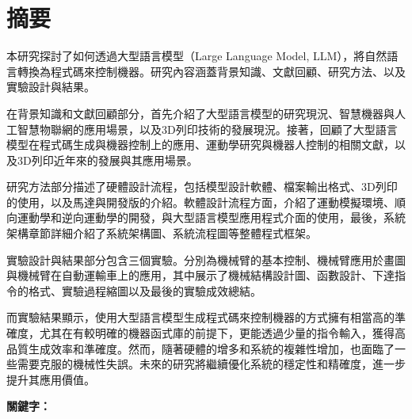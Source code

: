 \documentclass[class=NCU_thesis, crop=false]{standalone}
\begin{document}
\chapter{摘要}

本研究探討了如何透過大型語言模型（Large Language Model, LLM），將自然語言轉換為程式碼來控制機器。研究內容涵蓋背景知識、文獻回顧、研究方法、以及實驗設計與結果。

在背景知識和文獻回顧部分，首先介紹了大型語言模型的研究現況、智慧機器與人工智慧物聯網的應用場景，以及3D列印技術的發展現況。接著，回顧了大型語言模型在程式碼生成與機器控制上的應用、運動學研究與機器人控制的相關文獻，以及3D列印近年來的發展與其應用場景。

研究方法部分描述了硬體設計流程，包括模型設計軟體、檔案輸出格式、3D列印的使用，以及馬達與開發版的介紹。軟體設計流程方面，介紹了運動模擬環境、順向運動學和逆向運動學的開發，與大型語言模型應用程式介面的使用，最後，系統架構章節詳細介紹了系統架構圖、系統流程圖等整體程式框架。

實驗設計與結果部分包含三個實驗。分別為機械臂的基本控制、機械臂應用於畫圖與機械臂在自動運輸車上的應用，其中展示了機械結構設計圖、函數設計、下達指令的格式、實驗過程縮圖以及最後的實驗成效總結。

而實驗結果顯示，使用大型語言模型生成程式碼來控制機器的方式擁有相當高的準確度，尤其在有較明確的機器函式庫的前提下，更能透過少量的指令輸入，獲得高品質生成效率和準確度。然而，隨著硬體的增多和系統的複雜性增加，也面臨了一些需要克服的機械性失誤。未來的研究將繼續優化系統的穩定性和精確度，進一步提升其應用價值。

\vspace{2em}
\noindent \textbf{關鍵字：} \keywordsZh{} %
\end{document}
